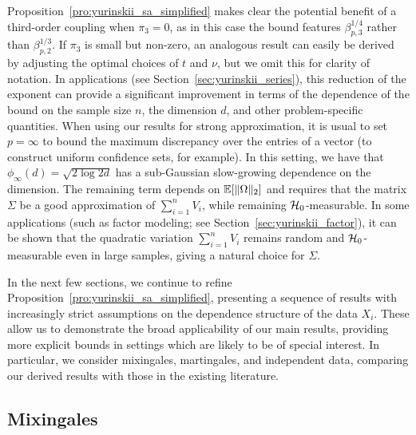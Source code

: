Proposition~\ref{pro:yurinskii_sa_simplified} makes clear the potential benefit
of a
third-order coupling when $\pi_3 = 0$, as in this case the bound features
$\beta_{p,3}^{1/4}$ rather than $\beta_{p,2}^{1/3}$. If $\pi_3$ is small but
non-zero, an analogous result can easily be derived by adjusting the optimal
choices of $t$ and $\nu$, but we omit this for clarity of notation. In
applications (see Section~\ref{sec:yurinskii_series}), this reduction of the
exponent can
provide a significant improvement in terms of the dependence of the bound on
the sample size $n$, the dimension $d$, and other problem-specific quantities.
When using our results for strong approximation, it is usual to set
$p = \infty$ to bound the maximum discrepancy over the entries of a vector (to
construct uniform confidence sets, for example). In this setting, we have that
$\phi_\infty(d) = \sqrt{2 \log 2d}$ has a sub-Gaussian slow-growing dependence
on the dimension. The remaining term depends on $\mathbb{E}[\|\Omega\|_2]$ and requires
that the matrix $\Sigma$ be a good approximation of $\sum_{i=1}^{n} V_i$, while
remaining $\mathcal{H}_0$-measurable. In some applications (such as factor modeling;
see Section~\ref{sec:yurinskii_factor}), it can be shown that the quadratic
variation
$\sum_{i=1}^n V_i$ remains random and $\mathcal{H}_0$-measurable even in large samples,
giving a natural choice for $\Sigma$.

In the next few sections, we continue to refine
Proposition~\ref{pro:yurinskii_sa_simplified}, presenting a sequence of results
with
increasingly strict assumptions on the dependence structure of the data $X_i$.
These allow us to demonstrate the broad applicability of our main results,
providing more explicit bounds in settings which are likely to be of special
interest. In particular, we consider mixingales, martingales, and independent
data, comparing our derived results with those in the existing literature.

\subsection{Mixingales}
\label{sec:yurinskii_mixingales}

